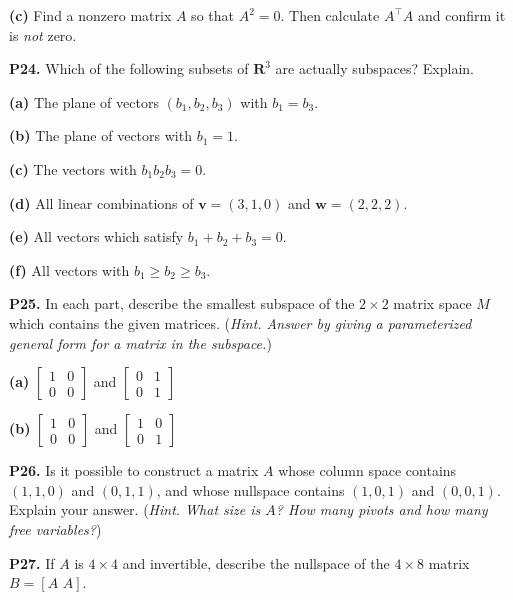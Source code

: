 \documentclass[12pt]{amsart}
\newcommand{\bv}{\bm{v}}
\newcommand{\bw}{\bm{w}}
\newcommand{\bR}{\bm{R}}
\newcommand{\prob}[1]{\bigskip\noindent\textbf{#1.}\quad }
\newcommand{\epart}[1]{\medskip\noindent\textbf{(#1)}\quad }
\begin{document}
\epart{c}  Find a nonzero matrix $A$ so that $A^2=0$.  Then calculate $A^\top A$ and confirm it is \emph{not} zero.


\prob{P24}  Which of the following subsets of $\bR^3$ are actually subspaces?  Explain.

\epart{a}  The plane of vectors $(b_1,b_2,b_3)$ with $b_1=b_3$.

\epart{b}  The plane of vectors with $b_1=1$.

\epart{c}  The vectors with $b_1 b_2 b_3 = 0$.

\epart{d}  All linear combinations of $\bv = (3,1,0)$ and $\bw = (2,2,2)$.

\epart{e}  All vectors which satisfy $b_1+b_2+b_3=0$.

\epart{f}  All vectors with $b_1 \ge b_2 \ge b_3$.


\prob{P25}  In each part, describe the smallest subspace of the $2\times 2$ matrix space $M$ which contains the given matrices.  (\emph{Hint.  Answer by giving a parameterized general form for a matrix in the subspace.})

\epart{a} $\begin{bmatrix} 1 & 0 \\ 0 & 0 \end{bmatrix}$ and $\begin{bmatrix} 0 & 1 \\ 0 & 1 \end{bmatrix}$

\epart{b} $\begin{bmatrix} 1 & 0 \\ 0 & 0 \end{bmatrix}$ and $\begin{bmatrix} 1 & 0 \\ 0 & 1 \end{bmatrix}$


\prob{P26}  Is it possible to construct a matrix $A$ whose column space contains $(1,1,0)$ and $(0,1,1)$, and whose nullspace contains $(1,0,1)$ and $(0,0,1)$.  Explain your answer.  (\emph{Hint.  What size is $A$?  How many pivots and how many free variables?})


\prob{P27}  If $A$ is $4\times 4$ and invertible, describe the nullspace of the $4\times 8$ matrix $B=[A\,\,A]$.
\end{document}
